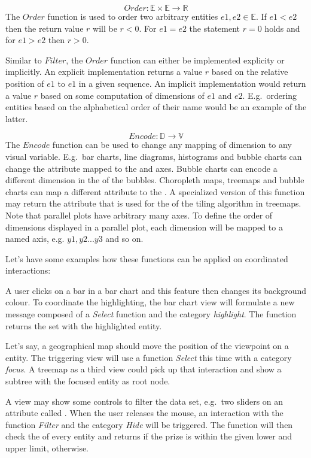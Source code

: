 \begin{equation} Order: \mathbb{E} \times \mathbb{E} \rightarrow \mathbb{R} \end{equation}
  The $Order$ function is used to order two arbitrary entities $e1, e2 \in \mathbb{E}$.
  If $e1 < e2$ then the return value $r$ will be $ r < 0 $.
  For $e1 = e2$ the statement $r = 0$ holds and for $e1 > e2$ then $r > 0$.

  Similar to $Filter$, the $Order$ function can either be implemented explicity or implicitly.
  An explicit implementation returns a value $r$ based on the relative position of $e1$ to $e1$ in a given sequence.
  An implicit implementation would return a value $r$ based on some computation of dimensions of $e1$ and $e2$.
  E.g.\ ordering entities based on the alphabetical order of their name would be an example of the latter.

\begin{equation} Encode: \mathbb{D} \rightarrow \mathbb{V} \end{equation}
  The $Encode$ function can be used to change any mapping of dimension to any visual variable.
  E.g.\ bar charts, line diagrams, histograms and bubble charts can change the attribute mapped to the  and  axes.
  Bubble charts can encode a different dimension in the  of the bubbles.
  Choropleth maps, treemaps and bubble charts can map a different attribute to the .
  A specialized version of this function may return the attribute that is used for the  of the tiling algorithm in treemaps.
  Note that parallel plots have arbitrary many  axes.
  To define the order of dimensions displayed in a parallel plot, each dimension will be mapped to a named  axis, e.g. $y1, y2 ... y3$ and so on.

Let's have some examples how these functions can be applied on coordinated interactions:

A user clicks on a bar in a bar chart and this feature then changes its background colour.
To coordinate the highlighting, the bar chart view will formulate a new message composed of a \emph{Select} function and the category \emph{highlight}.
The function returns the set with the highlighted entity.

Let's say, a geographical map should move the position of the viewpoint on a entity.
The triggering view will use a function \emph{Select} this time with a category \emph{focus}.
A treemap as a third view could pick up that interaction and show a subtree with the focused entity as root node. 

A view may show some controls to filter the data set, e.g.\ two sliders on an attribute called .
When the user releases the mouse, an interaction with the function \emph{Filter} and the category \emph{Hide} will be triggered.  
The function will then check the  of every entity and returns  if the prize is within the given lower and upper limit,  otherwise.


